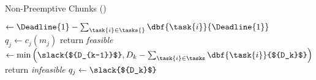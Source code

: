 \begin{algorithm}[H]
  \caption{Non-Preemptive Chunks (\npchunks{})}\label{alg:np-chunks}
  \begin{algorithmic}[1]
    \State {} ${\gets \Deadline{1} - \sum_{\task{i}
        \in \tasks{}}\dbf{\task{i}}{\Deadline{1}}}$ \label{line:D1}
    \label{line:npchunks-init-start}
        \State ${q_j \gets c_j(m_j)}$
    \EndFor
    \label{line:npchunks-init-end}        
        \State return \emph{feasible}
      \EndIf
      \State {} ${\gets \min
        \left(
          \slack{${D_{k-1}}$}, D_k - \sum_{\task{i} \in \tasks}
          \dbf{\task{i}}{${D_k}$} \label{line:slackDk}
        \right)
        }$
        \State return \emph{infeasible}
      \EndIf
          \State ${q_j \gets \slack{${D_k}$}}$
      \EndFor
    \EndFor
  \end{algorithmic}
\end{algorithm}
